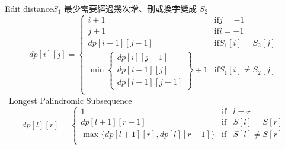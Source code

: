\begin{tiny}
    Edit distance$S_1$ 最少需要經過幾次增、刪或換字變成 $S_2$\
    $$dp[i][j] = \left \{
    \begin{array}{crc}
        i+1 & \mbox{if} j=-1 \\
        j+1 & \mbox{if} i=-1 \\
        dp[i-1][j-1]& \mbox{if} S_1[i] = S_2[j] \\
        \min\left \{
            \begin{array}{c}
                dp[i][j-1] \\ dp[i-1][j] \\ dp[i-1][j-1]
            \end{array}\right \}+1 & \mbox{if} S_1[i] \neq S_2[j] \\
    \end{array}\right .$$\
    Longest Palindromic Subsequence
    $$dp[l][r] = \left \{
        \begin{array}{crc}
            1 & \mbox{if} & l = r \\
            dp[l+1][r-1] & \mbox{if} & S[l] = S[r] \\
            \max\{dp[l+1][r], dp[l][r-1]\} & \mbox{if} & S[l] \neq S[r] \\
        \end{array}\right .$$
\end{tiny}
